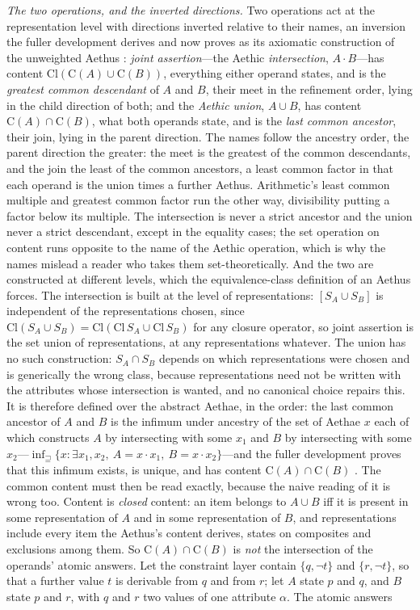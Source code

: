 \textit{The two operations, and the inverted directions.} Two operations act at the representation level with directions inverted relative to their names, an inversion the fuller development derives and now proves as its axiomatic construction of the unweighted Aethus \cite{Aethus}: \emph{joint assertion}---the Aethic \emph{intersection}, $A \cdot B$---has content $\mathrm{Cl}(\mathrm{C}(A) \cup \mathrm{C}(B))$, everything either operand states, and is the \emph{greatest common descendant} of $A$ and $B$, their meet in the refinement order, lying in the child direction of both; and the \emph{Aethic union}, $A \cup B$, has content $\mathrm{C}(A) \cap \mathrm{C}(B)$, what both operands state, and is the \emph{last common ancestor}, their join, lying in the parent direction. The names follow the ancestry order, the parent direction the greater: the meet is the greatest of the common descendants, and the join the least of the common ancestors, a least common factor in that each operand is the union times a further Aethus. Arithmetic's least common multiple and greatest common factor run the other way, divisibility putting a factor below its multiple. The intersection is never a strict ancestor and the union never a strict descendant, except in the equality cases; the set operation on content runs opposite to the name of the Aethic operation, which is why the names mislead a reader who takes them set-theoretically. And the two are constructed at different levels, which the equivalence-class definition of an Aethus forces. The intersection is built at the level of representations: $[S_A \cup S_B]$ is independent of the representations chosen, since $\mathrm{Cl}(S_A \cup S_B) = \mathrm{Cl}(\mathrm{Cl}\,S_A \cup \mathrm{Cl}\,S_B)$ for any closure operator, so joint assertion is the set union of representations, at any representations whatever. The union has no such construction: $S_A \cap S_B$ depends on which representations were chosen and is generically the wrong class, because representations need not be written with the attributes whose intersection is wanted, and no canonical choice repairs this. It is therefore defined over the abstract Aethae, in the order: the last common ancestor of $A$ and $B$ is the infimum under ancestry of the set of Aethae $x$ each of which constructs $A$ by intersecting with some $x_1$ and $B$ by intersecting with some $x_2$---$\inf_{\sqsupseteq}\{x : \exists x_1, x_2,\ A = x \cdot x_1,\ B = x \cdot x_2\}$---and the fuller development proves that this infimum exists, is unique, and has content $\mathrm{C}(A) \cap \mathrm{C}(B)$ \cite{Aethus}. The common content must then be read exactly, because the naive reading of it is wrong too. Content is \emph{closed} content: an item belongs to $A \cup B$ iff it is present in some representation of $A$ and in some representation of $B$, and representations include every item the Aethus's content derives, states on composites and exclusions among them. So $\mathrm{C}(A) \cap \mathrm{C}(B)$ is \emph{not} the intersection of the operands' atomic answers. Let the constraint layer contain $\{q, \neg t\}$ and $\{r, \neg t\}$, so that a further value $t$ is derivable from $q$ and from $r$; let $A$ state $p$ and $q$, and $B$ state $p$ and $r$, with $q$ and $r$ two values of one attribute $\alpha$. The atomic answers 
